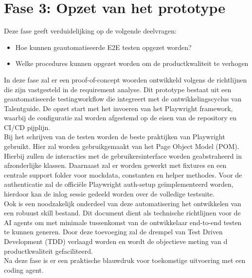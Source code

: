 \section{Fase 3: Opzet van het prototype}
Deze fase geeft verduidelijking op de volgende deelvragen:
\begin{itemize}
    \item Hoe kunnen geautomatiseerde E2E testen opgezet worden?
    \item Welke procedures kunnen opgezet worden om de productkwaliteit te verhogen
\end{itemize}

In deze fase zal er een proof-of-concept woorden ontwikkeld volgens de richtlijnen die zijn vastgesteld in de requirement analyse. Dit prototype bestaat uit een geautomatiseerde testingworkflow die integreert met de ontwikkelingscyclus van Talentguide. De opzet start met het invoeren van het Playwright framework, waarbij de configuratie zal worden afgestemd op de eisen van de repository en CI/CD pijplijn.
\bigskip
\\
Bij het schrijven van de testen worden de beste praktijken van Playwright gebruikt. Hier zal worden gebruikgemaakt van het Page Object Model (POM). Hierbij zullen de interacties met de gebruikersinterface worden geabstraheerd in afzonderlijke klassen. Daarnaast zal er worden gewerkt met fixtures en een centrale support folder voor mockdata, constanten en helper methodes. Voor de authenticatie zal de officiële Playwright auth-setup geïmplementeerd worden, hierdoor kan de inlog sessie gedeeld worden over de volledige testsuite.
\bigskip
\\
Ook is een noodzakelijk onderdeel van deze automatisering het ontwikkelen van een robuust skill bestand. Dit document dient als technische richtlijnen voor de AI agents om met minimale tussenkomst van de ontwikkelaar end-to-end testen te kunnen generen. Door deze toevoeging zal de drempel van Test Driven Development (TDD) verlaagd worden en wordt de objectieve meting van d productkwaliteit gefaciliteerd.
\bigskip
\\
Na deze fase is er een praktische blauwdruk voor toekomstige uitvoering met een coding agent.

